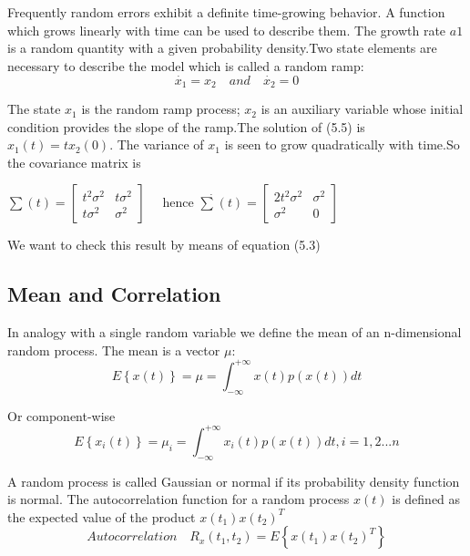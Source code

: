 	    Frequently random errors exhibit a definite time-growing behavior. A function which grows linearly with time can be used to describe them. The growth rate $ a1 $ is a random quantity with a given probability density.Two state elements are necessary to describe the model which is called a random ramp: 
	    \begin{equation}\label{5.5}
	    \dot{x_{1}}=x_{2}\quad and \quad \dot{x_{2}}=0
	    \end{equation}
	   
	    
	    The state $ x_{1} $ is the random ramp process; $ x_{2} $ is an auxiliary variable whose initial condition provides the slope of the ramp.The solution of (5.5) is $ x_{1}(t)=tx_{2}(0) $. The variance of $ x_{1} $ is seen to grow quadratically with time.So the covariance matrix is
	    
	   $ \sum(t)=\begin{bmatrix} t^{2}\sigma^{2} & t\sigma^{2} \\ t\sigma^{2} & \sigma^{2} \end{bmatrix} \quad $  hence   $ \dot{\sum}(t)=\begin{bmatrix} 2t^{2}\sigma^{2} & \sigma^{2} \\ \sigma^{2} & 0 \end{bmatrix} \quad  $ 
	   
	   We want to check this result by means of equation (5.3)
	   
	   \subsection {Mean and Correlation}  
	  In analogy with a single random variable we define the mean of an n-dimensional random process. The mean is a vector $ \mu $:
	  \begin{equation}\label{5.6}
	  E\left\lbrace  x(t)\right\rbrace  =\mu=\int_{-\infty}^{+\infty}x(t)p(x(t))dt
	  \end{equation}
	 
	  
	  Or component-wise
	  \begin{equation}\label{5.7}
	   E\left\lbrace  x_{i}(t)\right\rbrace  =\mu_{i}=\int_{-\infty}^{+\infty}x_{i}(t)p(x(t))dt,i=1,2...n
	  \end{equation}
	  
	  
	  A random process is called Gaussian or normal if its probability density function is normal. The autocorrelation function for a random process $ x(t) $ is defined as the expected value of the product $ x(t_{1})x(t_{2})^{T} $
	  \begin{equation}\label{5.8}
	   Autocorrelation \quad R_{x}(t_{1},t_{2}) =E\left\lbrace x(t_{1})x(t_{2})^{T}\right\rbrace 
	  \end{equation}
	  
